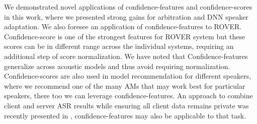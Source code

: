 We demonstrated novel applications of confidence-features and confidence-scores in this work, where we presented strong gains for arbitration and DNN speaker adaptation. We also foresee an application of confidence-features to ROVER. Confidence-score is one of the strongest features for  ROVER system but these scores can be in different range across the individual systems, requiring an additional step of score normalization. We have noted that Confidence-features generalize across acoustic models and thus avoid requiring normalization. Confidence-scores are also used in model recommendation for different speakers, where we recommend one of the many AMs that may work best for particular speakers, there too we can leverage confidence-features. An approach to combine client and server ASR results while ensuring all client data remains private was recently presented in \cite{Nuance_Arbitration},  confidence-features may also be applicable to that task.
